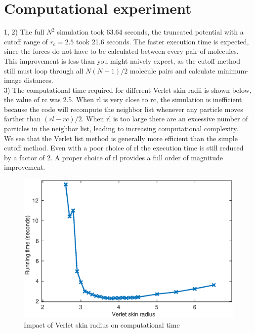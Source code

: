 \documentclass[a4paper,11pt]{article}
\numberwithin{equation}{section}
\begin{document}
\section{Computational experiment}
1, 2) The full $N^2$ simulation took 63.64 seconds, the truncated potential with a cutoff range of $r_c=2.5$ took 21.6 seconds. 
The faster execution time is expected, since the forces do not have to be calculated between every pair of molecules.
This improvement is less than you might naively expect, as the cutoff method still must loop through all $N(N-1)/2$ molecule pairs and calculate minimum-image distances.
\\
3) The computational time required for different Verlet skin radii is shown below, the value of rc was 2.5. 
When rl is very close to rc, the simulation is inefficient because the code will recompute the neighbor list whenever any particle moves farther than $(rl-rc)/2$.
When rl is too large there are an excessive number of particles in the neighbor list, leading to increasing computational complexity.\\
We see that the Verlet list method is generally more efficient than the simple cutoff method. Even with a poor choice of rl the execution time is still reduced by a factor of 2.
A proper choice of rl provides a full order of magnitude improvement.
\\
\begin{figure}[h]
 \caption{Impact of Verlet skin radius on computational time}
 \centering
   \includegraphics[width=\textwidth]{p1}
\end{figure}
\end{document}
